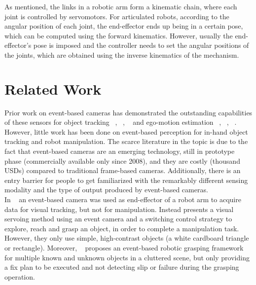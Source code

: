 As mentioned, the links in a robotic arm form a kinematic chain, where each joint is controlled by servomotors. For articulated robots, according to the angular position of each joint, the end-effector ends up being in a certain pose, which can be computed using the forward kinematics. However, usually the end-effector's pose is imposed and the controller needs to set the angular positions of the joints, which are obtained using the inverse kinematics of the mechanism.

\section{Related Work}

Prior work on event-based cameras has demonstrated the outstanding capabilities of these sensors for object tracking ~\cite{OT1}, ~\cite{OT2}, ~\cite{gallego2020} and ego-motion estimation ~\cite{EM1}, ~\cite{EM2}, ~\cite{gallego2020}. However, little work has been done on event-based perception for in-hand object tracking and robot manipulation. The scarce literature in the topic is due to the fact that event-based cameras are an emerging technology, still in prototype phase (commercially available only since 2008), and they are costly (thousand USDs) compared to traditional frame-based cameras. Additionally, there is an entry barrier for people to get familiarized with the remarkably different sensing modality and the type of output produced by event-based cameras.\\

In ~\cite{barranco2018} an event-based camera was used as end-effector of a robot arm to acquire data for visual tracking, but not for manipulation. Instead \cite{muthusamy2020} presents a visual servoing method using an event camera and a switching control strategy to explore, reach and grasp an object, in order to complete a manipulation task. However, they only use simple, high-contrast objects (a white cardboard triangle or rectangle). Moreover, ~\cite{huang2021} proposes an event-based robotic grasping framework for multiple known and unknown objects in a cluttered scene, but only providing a fix plan to be executed and not detecting slip or failure during the grasping operation.\\

